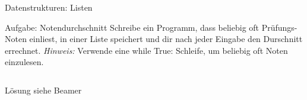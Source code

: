 \begin{frame}[fragile]{Datenstrukturen: Listen}
\begin{block}{Aufgabe: Notendurchschnitt}
Schreibe ein Programm, dass beliebig oft Prüfungs-Noten einliest, in einer
Liste speichert und dir nach jeder Eingabe den Durschnitt errechnet. 
\textit{Hinweis:} Verwende eine while True: Schleife, um beliebig oft 
Noten einzulesen.
\end{block}
\begin{lstlisting}

\end{lstlisting}
\pause{}
\begin{exampleblock}{Lösung}
siehe Beamer
\end{exampleblock}
\end{frame}


